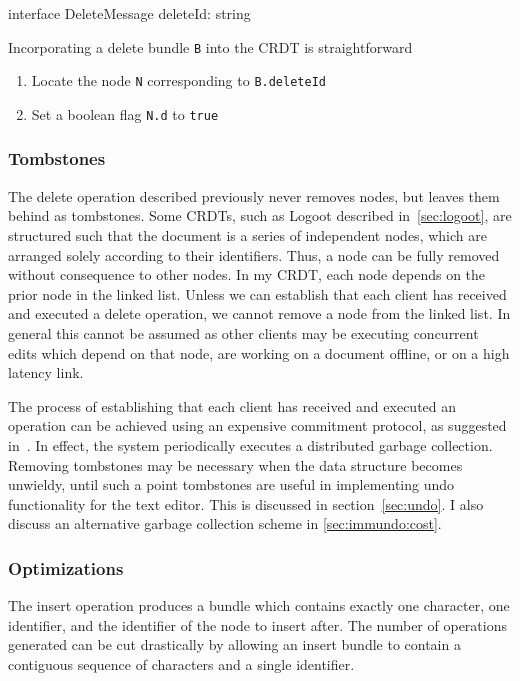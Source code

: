 \documentclass[12pt,a4paper,twoside,openright]{report}
\begin{document}
\vspace{3mm}
\begin{typescript}
interface DeleteMessage {
    deleteId: string
}
\end{typescript}				
				
				Incorporating a delete bundle \texttt{B} into the CRDT is straightforward
				\begin{enumerate}
					\item Locate the node \texttt{N} corresponding to \texttt{B.deleteId}
					\item Set a boolean flag \texttt{N.d} to \texttt{true}
				\end{enumerate}
				
		\subsubsection{Tombstones}
			The delete operation described previously never removes nodes, but leaves them behind as tombstones. Some CRDTs, such as Logoot described in~\cref{sec:logoot}, are structured such that the document is a series of independent nodes, which are arranged solely according to their identifiers. Thus, a node can be fully removed without consequence to other nodes. In my CRDT, each node depends on the prior node in the linked list. Unless we can establish that each client has received and executed a delete operation, we cannot remove a node from the linked list. In general this cannot be assumed as other clients may be executing concurrent edits which depend on that node, are working on a document offline, or on a high latency link.
			
			The process of establishing that each client has received and executed an operation can be achieved using an expensive commitment protocol, as suggested in~\cite{preguica2009}. In effect, the system periodically executes a distributed garbage collection. Removing tombstones may be necessary when the data structure becomes unwieldy, until such a point tombstones are useful in implementing undo functionality for the text editor. This is discussed in section~\cref{sec:undo}. I also discuss an alternative garbage collection scheme in \cref{sec:immundo:cost}.
			
		
		\subsubsection{Optimizations}
			The insert operation produces a bundle which contains exactly one character, one identifier, and the identifier of the node to insert after. The number of operations generated can be cut drastically by allowing an insert bundle to contain a contiguous sequence of characters and a single identifier.
			
\end{document}
